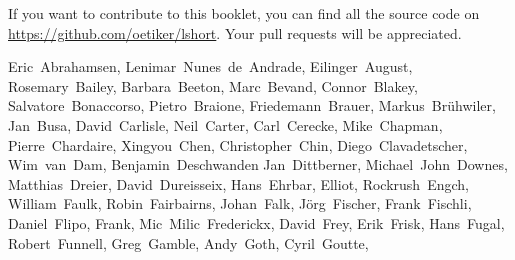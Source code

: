 If you want to contribute to this booklet, you can find all the source code
on \url{https://github.com/oetiker/lshort}. Your pull requests will be
appreciated.

\begin{flushleft}
  \small
  Eric~Abrahamsen,        %
  Lenimar~Nunes~de~Andrade, %
  Eilinger~August,        %
  Rosemary~Bailey,        %
  Barbara~Beeton,         %
  Marc~Bevand,            %
  Connor~Blakey,          %
  Salvatore~Bonaccorso,   %
  Pietro~Braione,         %
  Friedemann~Brauer,      %
  Markus~Br\"uhwiler,     %
  Jan~Busa,               %
  David~Carlisle,         %
  Neil~Carter,            %
  Carl~Cerecke,           %
  Mike~Chapman,           %
  Pierre~Chardaire,       %
  Xingyou~Chen,           %
  Christopher~Chin,       %
  Diego~Clavadetscher,    %
  Wim~van~Dam,            %
  Benjamin~Deschwanden    %
  Jan~Dittberner,         %
  Michael~John~Downes,    %
  Matthias~Dreier,        %
  David~Dureisseix,       %
  Hans~Ehrbar,            %
  Elliot,                 %
  Rockrush~Engch,         %
  William~Faulk,          %
  Robin~Fairbairns,       %
  Johan~Falk,             %
  J\"org~Fischer,         %
  Frank~Fischli,          %
  Daniel~Flipo,           %
  Frank,                  %
  Mic~Milic~Frederickx,   %
  David~Frey,             %
  Erik~Frisk,             %
  Hans~Fugal,             %
  Robert~Funnell,         %
  Greg~Gamble,            %
  Andy~Goth,              %
  Cyril~Goutte,           %

\end{flushleft}
